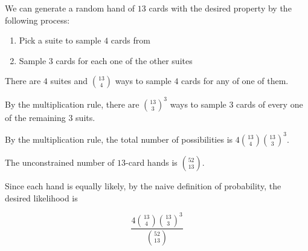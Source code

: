 We can generate a random hand of $13$ cards with the desired property by 
the following process:

\begin{enumerate}
  \item Pick a suite to sample $4$ cards from

  \item Sample $3$ cards for each one of the other suites
\end{enumerate}

There are $4$ suites and $\binom{13}{4}$ ways to sample $4$ cards for any 
of one of them. 

By the multiplication rule, there are $\binom{13}{3}^{3}$ ways to sample $3$ 
cards of every one of the remaining $3$ suits. 

By the multiplication rule, the total number of possibilities is 
$4 \binom{13}{4} \binom{13}{3}^{3}.$

The unconstrained number of $13$-card hands is $\binom{52}{13}$. 

Since each hand is equally likely, by the naive definition of probability, 
the desired likelihood is

$$ \frac{4 \binom{13}{4} \binom{13}{3}^{3}}{\binom{52}{13}} $$